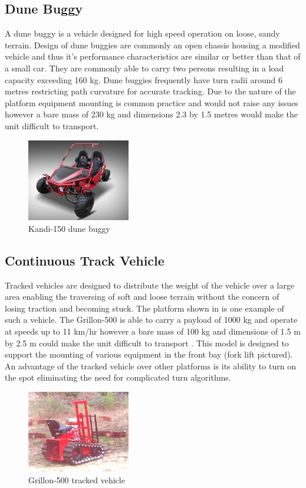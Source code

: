 \documentclass[main.tex]{subfiles}
\begin{document}
\subsection{Dune Buggy}
A dune buggy is a vehicle designed for high speed operation on loose, sandy terrain. Design of dune buggies are commonly an open chassis housing a modified vehicle and thus it's performance characteristics are similar or better than that of a small car. They are commonly able to carry two persons resulting in a load capacity exceeding 160 kg. Dune buggies frequently have turn radii around 6 metres restricting path curvature for accurate tracking. Due to the nature of the platform equipment mounting is common practice and would not raise any issues however a bare mass of 230 kg and dimensions 2.3 by 1.5 metres would make the unit difficult to transport.
\begin{figure}[ht]
\includegraphics[width=0.4\textwidth]{4-ConceptDesign/kandidunebuggy.jpg}
\centering
\caption[Kandi-150 dune buggy]{Kandi-150 dune buggy \parencite{150GKM}} 
\end{figure}

\subsection{Continuous Track Vehicle}
Tracked vehicles are designed to distribute the weight of the vehicle over a large area enabling the traversing of soft and loose terrain without the concern of losing traction and becoming stuck. The platform shown in  is one example of such a vehicle. The Grillon-500 is able to carry a payload of 1000 kg and operate at speeds up to 11 km/hr however a bare mass of 100 kg and dimensions of 1.5 m by 2.5 m could make the unit difficult to transport \parencite{cinamGrillon}. This model is designed to support the mounting of various equipment in the front bay (fork lift pictured). An advantage of the tracked vehicle over other platforms is its ability to turn on the spot eliminating the need for complicated turn algorithms. 
\begin{figure}[ht]
\includegraphics[width=0.4\textwidth]{4-ConceptDesign/Grillon-500.jpg}
\centering
\caption[Grillon-500 tracked vehicle]{Grillon-500 tracked vehicle \parencite{cinamGrillon}} 
\end{figure}
\end{document}
